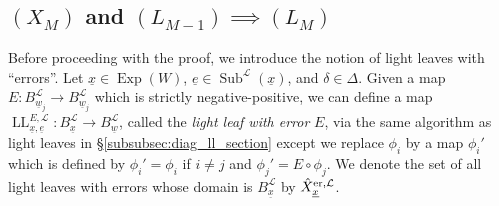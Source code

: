 \documentclass{amsart}
\newcommand{\scrL}{\mathcal{L}}
\DeclareMathOperator{\LL}{LL}
\DeclareMathOperator{\Exp}{Exp}
\DeclareMathOperator{\Subexp}{Sub}
\newcommand{\ue}{\underline{e}}
\newcommand{\uw}{\underline{w}}
\newcommand{\ux}{\underline{x}}
\theoremstyle{definition}
\numberwithin{equation}{subsection}
\begin{document}
\subsection{\texorpdfstring{$(X_M)$ and $(L_{M-1}) \implies (L_M)$}{XM and LM-1 implies LM}}

Before proceeding with the proof, we introduce the notion of light leaves with ``errors''.
Let $\ux \in \Exp (W)$, $\ue \in \Subexp^{\scrL} (\ux)$, and $\delta \in \Delta$. 
Given a map $E : B_{\uw_j}^{\scrL} \to B_{\uw_j}^{\scrL}$ which is strictly negative-positive, we can define a map $\LL_{\ux, \ue}^{E, \scrL} : B_{\ux}^{\scrL} \to B_{\uw}^{\scrL}$,
called the \emph{light leaf with error} $E$, via the same algorithm as light leaves in \S\ref{subsubsec:diag_ll_section}
except we replace $\phi_i$ by a map $\phi_i'$ which is defined by $\phi_i' = \phi_i$ if $i \neq j$ and $\phi_j' = E \circ \phi_j$.
We denote the set of all light leaves with errors whose domain is $B_{\ux}^{\scrL}$ by $\hat{X}_{\ux}^{\textnormal{er}, \scrL}$.
\end{document}
